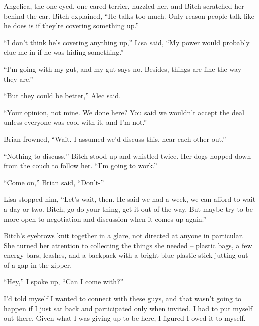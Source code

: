 Angelica, the one eyed, one eared terrier, nuzzled her, and Bitch scratched her behind the ear.  Bitch explained, ``He talks too much.  Only reason people talk like he does is if they're covering something up.''



``I don't think he's covering anything up,'' Lisa said, ``My power would probably clue me in if he was hiding something.''



``I'm going with my gut, and my gut says no.  Besides, things are fine the way they are.''



``But they could be better,'' Alec said.



``Your opinion, not mine.  We done here?  You said we wouldn't accept the deal unless everyone was cool with it, and I'm not.''



Brian frowned, ``Wait.  I assumed we'd discuss this, hear each other out.''



``Nothing to discuss,'' Bitch stood up and whistled twice.  Her dogs hopped down from the couch to follow her.  ``I'm going to work.''



``Come on,'' Brian said, ``Don't-''



Lisa stopped him, ``Let's wait, then.  He said we had a week, we can afford to wait a day or two.  Bitch, go do your thing, get it out of the way.  But maybe try to be more open to negotiation and discussion when it comes up again.''



Bitch's eyebrows knit together in a glare, not directed at anyone in particular.  She turned her attention to collecting the things she needed – plastic bags, a few energy bars, leashes, and a backpack with a bright blue plastic stick jutting out of a gap in the zipper.



``Hey,'' I spoke up, ``Can I come with?''



I'd told myself I wanted to connect with these guys, and that wasn't going to happen if I just sat back and participated only when invited.  I had to put myself out there.  Given what I was giving up to be here, I figured I owed it to myself.



